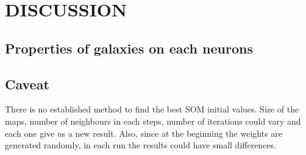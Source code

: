 
\section{DISCUSSION}
\label{sec: diss}
   \subsection{Properties of galaxies on each neurons}
    \subsection{Caveat}
    There is no established method to find the best SOM initial values. Size of the maps, number of neighbours in each steps, number of iterations could vary and each one give us a new result.
    Also, since at the beginning the weights are generated randomly, in each run the results could have small differences.
    
    